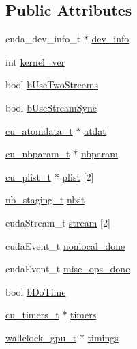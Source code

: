 \subsection*{\-Public \-Attributes}
\begin{DoxyCompactItemize}
\item 
cuda\-\_\-dev\-\_\-info\-\_\-t $\ast$ \hyperlink{structnbnxn__cuda_a42292fb3ba240db4470f7918f1c81007}{dev\-\_\-info}
\item 
int \hyperlink{structnbnxn__cuda_ae90a52f76167162f3d759f2c9da39990}{kernel\-\_\-ver}
\item 
bool \hyperlink{structnbnxn__cuda_ae3882ccf40b3b603188e85b4d2290c97}{b\-Use\-Two\-Streams}
\item 
bool \hyperlink{structnbnxn__cuda_a2fb78d73b3eb4f11e94ef0fe9796ac84}{b\-Use\-Stream\-Sync}
\item 
\hyperlink{nbnxn__cuda__types_8h_a8c1c07e97b961f6abdb244a970ec6cf5}{cu\-\_\-atomdata\-\_\-t} $\ast$ \hyperlink{structnbnxn__cuda_a629906b31cd6213ce521da39e272ae31}{atdat}
\item 
\hyperlink{nbnxn__cuda__types_8h_a22e7df0d1c5852bc6709abd8d02a16f6}{cu\-\_\-nbparam\-\_\-t} $\ast$ \hyperlink{structnbnxn__cuda_aba9bb073e52a3a38c76c3c961cf3e9d5}{nbparam}
\item 
\hyperlink{nbnxn__cuda__types_8h_aab8609d833a1b6d80d25c427c379a74f}{cu\-\_\-plist\-\_\-t} $\ast$ \hyperlink{structnbnxn__cuda_a08eaad7726f9bffa4b59f9c512e651ea}{plist} \mbox{[}2\mbox{]}
\item 
\hyperlink{nbnxn__cuda__types_8h_ab937fc69fb93a32d9d45421b50b4eeb2}{nb\-\_\-staging\-\_\-t} \hyperlink{structnbnxn__cuda_a54d97f678a3309082694a0f6844e3bbc}{nbst}
\item 
cuda\-Stream\-\_\-t \hyperlink{structnbnxn__cuda_ace7fa34883dfdcdc600dc32eefc5f9cb}{stream} \mbox{[}2\mbox{]}
\item 
cuda\-Event\-\_\-t \hyperlink{structnbnxn__cuda_a969134ff224660d312b07794e00abac3}{nonlocal\-\_\-done}
\item 
cuda\-Event\-\_\-t \hyperlink{structnbnxn__cuda_ad553d8b261d141dd3bb4d9a8688e4c17}{misc\-\_\-ops\-\_\-done}
\item 
bool \hyperlink{structnbnxn__cuda_a559b44129362ae836979291d41e36d8b}{b\-Do\-Time}
\item 
\hyperlink{nbnxn__cuda__types_8h_a789888be27d2137badeb90cbcaed4df7}{cu\-\_\-timers\-\_\-t} $\ast$ \hyperlink{structnbnxn__cuda_a1b2be2186712b304e07892692015c695}{timers}
\item 
\hyperlink{include_2types_2nbnxn__cuda__types__ext_8h_ad97be7a8b4770fd5989bf4f84f116aae}{wallclock\-\_\-gpu\-\_\-t} $\ast$ \hyperlink{structnbnxn__cuda_a2b3d43a9134641c587a926e679eb55ab}{timings}
\end{DoxyCompactItemize}


